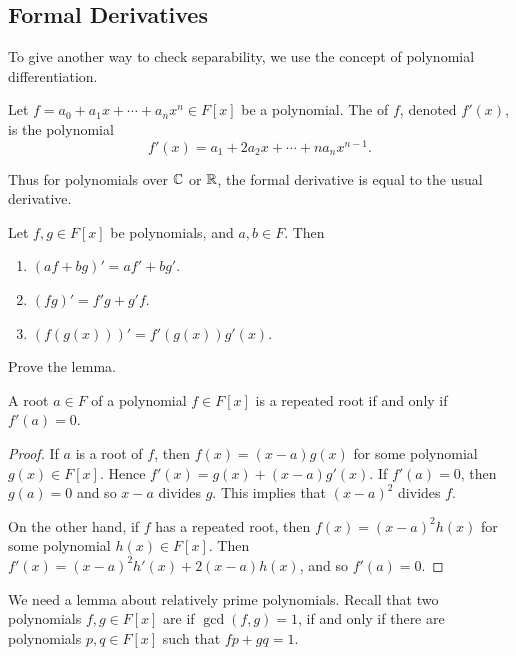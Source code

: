 \subsection*{Formal Derivatives}

To give another way to check separability, we use the concept of polynomial differentiation.

\begin{definition}
	Let $f = a_0 + a_1 x + \dotsb + a_n x^n \in F[x]$ be a polynomial. The  of  $f$, denoted $f'(x)$, is the polynomial
	\begin{equation*}
		f'(x) = a_1 + 2a_2x + \dotsb + na_n x^{n- 1}.
	\end{equation*}
\end{definition}

Thus for polynomials over $\mathbb C$ or $\mathbb R$, the formal derivative is equal to the usual derivative.

\begin{lemma}
	Let $f, g \in F[x]$ be polynomials, and $a, b \in F$. Then
	\begin{enumerate}
		\item $(af + bg)' = af' + bg'$.
		\item $(fg)' = f'g + g'f$.
		\item $(f(g(x)))' = f'(g(x))g'(x)$.
	\end{enumerate}
\end{lemma}
\begin{exercise}
	Prove the lemma.
\end{exercise}

\begin{lemma}\label{chap4:root-is-repeated-iff-is-root-of-deriv}
	A root $a \in F$ of a polynomial $f \in F[x]$ is a repeated root if and only if $f'(a) = 0$.
\end{lemma}
\begin{proof}
	If $a$ is a root of $f$, then $f(x) = (x - a)g(x)$ for some polynomial $g(x) \in F[x]$. Hence $f'(x) = g(x) + (x - a)g'(x)$. If $f'(a) = 0$, then $g(a) = 0$ and so $x - a$ divides $g$. This implies that $(x - a)^2$ divides $f$. 
	
	On the other hand, if $f$ has a repeated root, then $f(x) = (x -a)^2h(x)$ for some polynomial $h(x) \in F[x]$. Then $f'(x) = (x - a)^2h'(x) + 2(x -a)h(x)$, and so $f'(a) = 0$.
\end{proof}

We need a lemma about relatively prime polynomials. Recall that two polynomials $f, g \in F[x]$ are  if $\gcd(f, g) = 1$, if and only if there are polynomials $p, q \in F[x]$ such that $fp + gq = 1$.

